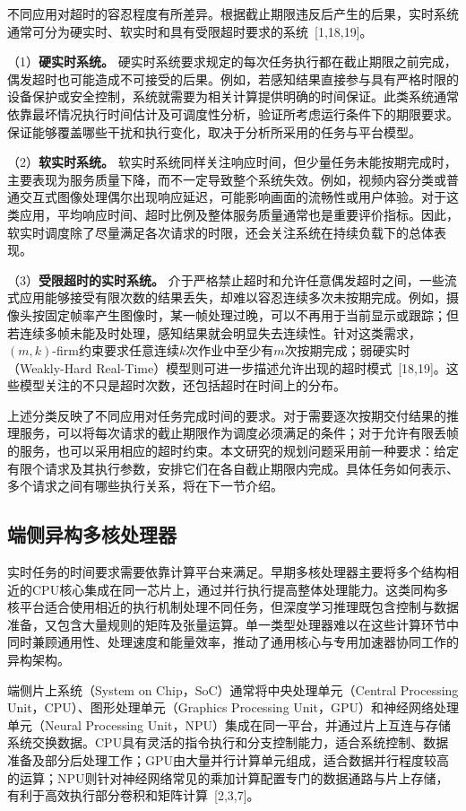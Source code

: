 不同应用对超时的容忍程度有所差异。根据截止期限违反后产生的后果，实时系统通常可分为硬实时、软实时和具有受限超时要求的系统~[1,18,19]。

（1）\textbf{硬实时系统。} 硬实时系统要求规定的每次任务执行都在截止期限之前完成，偶发超时也可能造成不可接受的后果。例如，若感知结果直接参与具有严格时限的设备保护或安全控制，系统就需要为相关计算提供明确的时间保证。此类系统通常依靠最坏情况执行时间估计及可调度性分析，验证所考虑运行条件下的期限要求。保证能够覆盖哪些干扰和执行变化，取决于分析所采用的任务与平台模型。

（2）\textbf{软实时系统。} 软实时系统同样关注响应时间，但少量任务未能按期完成时，主要表现为服务质量下降，而不一定导致整个系统失效。例如，视频内容分类或普通交互式图像处理偶尔出现响应延迟，可能影响画面的流畅性或用户体验。对于这类应用，平均响应时间、超时比例及整体服务质量通常也是重要评价指标。因此，软实时调度除了尽量满足各次请求的时限，还会关注系统在持续负载下的总体表现。

（3）\textbf{受限超时的实时系统。} 介于严格禁止超时和允许任意偶发超时之间，一些流式应用能够接受有限次数的结果丢失，却难以容忍连续多次未按期完成。例如，摄像头按固定帧率产生图像时，某一帧处理过晚，可以不再用于当前显示或跟踪；但若连续多帧未能及时处理，感知结果就会明显失去连续性。针对这类需求，$(m,k)$-firm约束要求任意连续$k$次作业中至少有$m$次按期完成；弱硬实时（Weakly-Hard Real-Time）模型则可进一步描述允许出现的超时模式~[18,19]。这些模型关注的不只是超时次数，还包括超时在时间上的分布。

上述分类反映了不同应用对任务完成时间的要求。对于需要逐次按期交付结果的推理服务，可以将每次请求的截止期限作为调度必须满足的条件；对于允许有限丢帧的服务，也可以采用相应的超时约束。本文研究的规划问题采用前一种要求：给定有限个请求及其执行参数，安排它们在各自截止期限内完成。具体任务如何表示、多个请求之间有哪些执行关系，将在下一节介绍。

\subsection{端侧异构多核处理器}

实时任务的时间要求需要依靠计算平台来满足。早期多核处理器主要将多个结构相近的CPU核心集成在同一芯片上，通过并行执行提高整体处理能力。这类同构多核平台适合使用相近的执行机制处理不同任务，但深度学习推理既包含控制与数据准备，又包含大量规则的矩阵及张量运算。单一类型处理器难以在这些计算环节中同时兼顾通用性、处理速度和能量效率，推动了通用核心与专用加速器协同工作的异构架构。

端侧片上系统（System on Chip，SoC）通常将中央处理单元（Central Processing Unit，CPU）、图形处理单元（Graphics Processing Unit，GPU）和神经网络处理单元（Neural Processing Unit，NPU）集成在同一平台，并通过片上互连与存储系统交换数据。CPU具有灵活的指令执行和分支控制能力，适合系统控制、数据准备及部分后处理工作；GPU由大量并行计算单元组成，适合数据并行程度较高的运算；NPU则针对神经网络常见的乘加计算配置专门的数据通路与片上存储，有利于高效执行部分卷积和矩阵计算~[2,3,7]。

